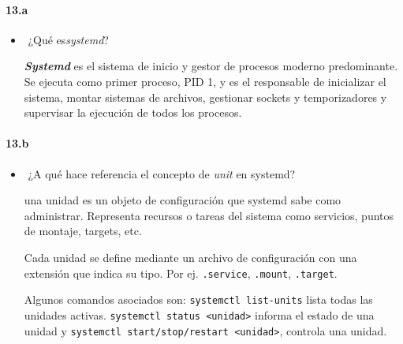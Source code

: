 \documentclass[10pt,a4paper]{paper}
\begin{document}
\paragraph{13.a}
\begin{itemize}
	
	\item​ ¿Qué es\textit{systemd}?
	
	
	\textit{\textbf{Systemd}} es el sistema de inicio y gestor de procesos moderno predominante. Se ejecuta como primer proceso, PID 1, y es el responsable de inicializar el sistema, montar sistemas de archivos, gestionar sockets y temporizadores y supervisar la ejecución de todos los procesos.
	
	
\end{itemize}






\paragraph{13.b}
\begin{itemize}
	
	\item​ ¿A qué hace referencia el concepto de \textit{unit} en systemd?
	
	una unidad es un objeto de configuración que systemd sabe como administrar. Representa recursos o tareas del sistema como servicios, puntos de montaje, targets, etc.
	
	Cada unidad se define mediante un archivo de configuración con una extensión que indica su tipo. Por ej. \texttt{.service}, \texttt{.mount}, \texttt{.target}.
	
	Algunos comandos asociados son: \texttt{systemctl list-units} lista todas las unidades activas. \texttt{systemctl status <unidad>} informa el estado de una unidad y \texttt{systemctl start/stop/restart <unidad>}, controla una unidad.
	
	
\end{itemize}
\end{document}
